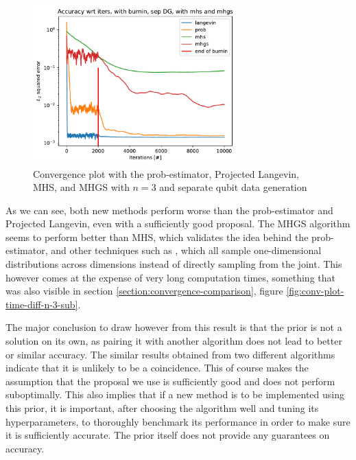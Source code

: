 \documentclass[12pt]{memoir}
\begin{document}
\begin{figure}[H]

    \centering

    \includegraphics[width=0.7\textwidth]{figures/experiments/mhs_mhgs/iters_acc_comp_iters_no_avg_sep_prob_pl_mhs_mhgs-1.png}

    \caption{Convergence plot with the prob-estimator, Projected Langevin, MHS, and MHGS with $n=3$ and separate qubit data generation}

    \label{fig:mhs-mhgs-conv-plot}

\end{figure}




As we can see, both new methods perform worse than the prob-estimator and Projected Langevin, even with a sufficiently good proposal. The MHGS algorithm seems to perform better than MHS, which validates the idea behind the prob-estimator, and other techniques such as \cite{Mai22, LLJL20}, which all sample one-dimensional distributions across dimensions instead of directly sampling from the joint. This however comes at the expense of very long computation times, something that was also visible in section \ref{section:convergence-comparison}, figure \ref{fig:conv-plot-time-diff-n-3-sub}.\medbreak


The major conclusion to draw however from this result is that the prior is not a solution on its own, as pairing it with another algorithm does not lead to better or similar accuracy. The similar results obtained from two different algorithms indicate that it is unlikely to be a coincidence. This of course makes the assumption that the proposal we use is sufficiently good and does not perform suboptimally. This also implies that if a new method is to be implemented using this prior, it is important, after choosing the algorithm well and tuning its hyperparameters, to thoroughly benchmark its performance in order to make sure it is sufficiently accurate. The prior itself does not provide any guarantees on accuracy.\medbreak
\end{document}
